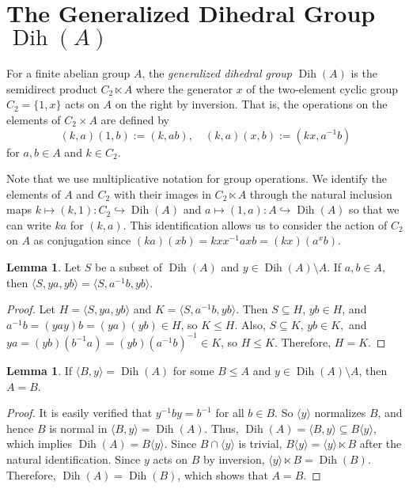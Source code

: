 \documentclass[12pt]{amsart}
\theoremstyle{definition}
\newtheorem{lemma}[equation]{Lemma}
\theoremstyle{definition}
\numberwithin{equation}{section}
\begin{document}
\section{The Generalized Dihedral Group ${\operatorname{Dih}}(A)$}

For a finite abelian group $A$, the \emph{generalized dihedral group} ${\operatorname{Dih}}(A)$
is the semidirect product $C_{2}\ltimes A$ where the generator $x$ of the two-element cyclic group $C_2=\{1,x\}$
acts on $A$ on the right by inversion. 
That is, the operations on the elements of $C_2\times A$ are defined by 
\[
(k,a)(1,b):=(k,ab),\quad (k,a)(x,b):=(kx,a^{-1}b)
\] 
for $a,b \in A$ and $k\in C_2$.  

Note that we use multiplicative notation for group operations. 
We identify the elements of $A$ and $C_2$ with their images in $C_{2}\ltimes A$ through the natural inclusion maps $k\mapsto (k,1):C_2\hookrightarrow {\operatorname{Dih}}(A)$ and $a\mapsto (1,a):A\hookrightarrow {\operatorname{Dih}}(A)$ 
so that we can write $ka$ for $(k,a)$.  
This identification allows us to consider the action of $C_2$ on $A$ as conjugation since $(ka)(xb) = kxx^{-1}axb=(kx)(a^xb)$.

\begin{lemma}\label{lem:twoinvolutionstransform}
Let $S$ be a subset of ${\operatorname{Dih}}(A)$ and $y \in {\operatorname{Dih}}(A) \setminus A$.
If $a, b \in A$, then $\langle S, ya, yb \rangle = \langle S, a^{-1}b, yb \rangle$.  
\end{lemma}

\begin{proof}
Let $H=\langle S, ya, yb \rangle$ and $K=\langle S, a^{-1}b, yb \rangle$.  Then $S \subseteq H$, $yb \in H$, and $a^{-1}b = (yay)b = (ya)(yb) \in H$, so $K \leq H$.  Also, $S \subseteq K$, $yb \in K,$ and $ya=(yb)(b^{-1}a)=(yb)(a^{-1}b)^{-1} \in K$, so $H \leq K$.  Therefore, $H=K$.
\end{proof}

\begin{lemma}\label{lem:DihASubgroups}
If $\langle B,y \rangle={\operatorname{Dih}}(A)$ for some $B\le A$ and $y \in {\operatorname{Dih}}(A) \setminus A$, then $A=B$.
\end{lemma}

\begin{proof}
It is easily verified that $y^{-1}by=b^{-1}$ for all $b\in B$. So $\langle y \rangle$ normalizes $B$, and hence $B$ is normal in $\langle B,y\rangle = {\operatorname{Dih}}(A)$.  Thus, ${\operatorname{Dih}}(A) = \langle B,y \rangle
\subseteq B\langle y \rangle$, which implies ${\operatorname{Dih}}(A)=B\langle y \rangle$. Since $B\cap \langle y \rangle$ is trivial, $B\langle y \rangle=\langle y \rangle \ltimes B$ after the natural identification.  Since $y$ acts on $B$ by inversion, $\langle y \rangle \ltimes B = {\operatorname{Dih}}(B)$. Therefore, ${\operatorname{Dih}}(A)={\operatorname{Dih}}(B)$, which shows that $A=B$. 
\end{proof}
\end{document}
